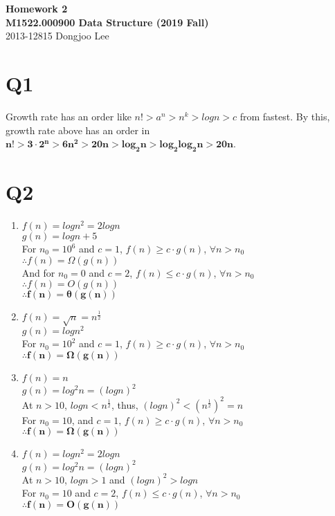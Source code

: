 \documentclass[12pt,a4paper]{article}
\begin{document}
\begin{center}
    {\bf\large Homework 2} \\
    {\bf\large M1522.000900 Data Structure (2019 Fall)} \\
    2013-12815 Dongjoo Lee \\
\end{center}

\section{Q1}
Growth rate has an order like $n!>a^n>n^k>logn>c$ from fastest. By this, growth rate above has an order in $\mathbf{n!>3\cdot2^n>6n^2>20n>log_2 n>log_2 log_2 n>20n}$.

\section{Q2}
\begin{enumerate}[label=(\arabic*)]
    \item
        $f(n)=logn^2=2logn$\\
        $g(n)=logn+5$\\
        For $n_0=10^6$ and $c=1$, $f(n)\geq  c\cdot g(n)$, $\forall n>n_0$\\
        $\therefore f(n)=\Omega(g(n))$\\
        And for $n_0=0$ and $c=2$, $f(n)\leq  c\cdot g(n)$, $\forall n>n_0$\\
        $\therefore f(n)=O(g(n))$\\
        $\mathbf{\therefore f(n)=\theta(g(n))}$

    \item
        $f(n)=\sqrt{n}=n^\frac{1}{2}$\\
        $g(n)=log n^2$\\
        For $n_0=10^2$ and $c=1$, $f(n)\geq  c\cdot g(n)$, $\forall n>n_0$\\
        $\mathbf{\therefore f(n)=\Omega(g(n))}$

    \item
        $f(n)=n$\\
        $g(n)=log^2 n=(logn)^2$\\
        At $n>10$, $logn<n^\frac{1}{2}$, thus, $(logn)^2<(n^\frac{1}{2})^2=n$\\
        For $n_0=10$, and $c=1$, $f(n)\geq  c\cdot g(n)$, $\forall n>n_0$\\
        $\mathbf{\therefore f(n)=\Omega(g(n))}$

    \item
        $f(n)=logn^2=2logn$\\
        $g(n)=log^2n=(logn)^2$\\
        At $n>10$, $logn>1$ and $(logn)^2>logn$\\
        For $n_0=10$ and $c=2$, $f(n)\leq  c\cdot g(n)$, $\forall n>n_0$\\
        $\mathbf{\therefore f(n)=O(g(n))}$
\end{enumerate}
\end{document}
